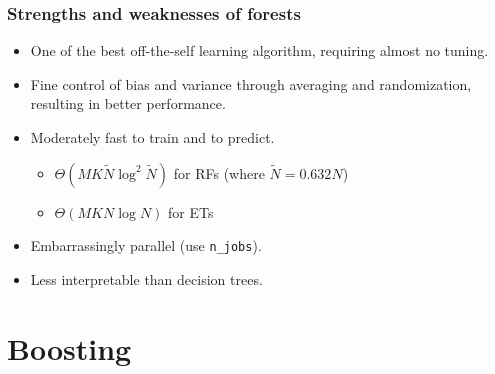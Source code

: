 \documentclass{beamer}
\begin{document}
\begin{frame}
  \frametitle{Strengths and weaknesses of forests}

  \begin{itemize}
    \item One of the best off-the-self learning algorithm, requiring almost
          no tuning.

    \vspace{0.25cm}

    \item {\color{blue}Fine control} of bias and variance through averaging
          and randomization, resulting in {\color{blue} better performance}.

    \vspace{0.25cm}

    \item Moderately fast to train and to predict.
        \begin{itemize}
            \item $\Theta(MK\widetilde{N}\log^2 \widetilde{N})$ for RFs (where $\widetilde{N} = 0.632N$)
            \item $\Theta(MKN\log N)$ for ETs
        \end{itemize}

    \vspace{0.25cm}

    \item Embarrassingly {\color{blue} parallel} (use \texttt{n\_jobs}).

    \vspace{0.25cm}

    \item {\color{red} Less interpretable} than decision trees.
  \end{itemize}
\end{frame}



\section{Boosting}
\end{document}
